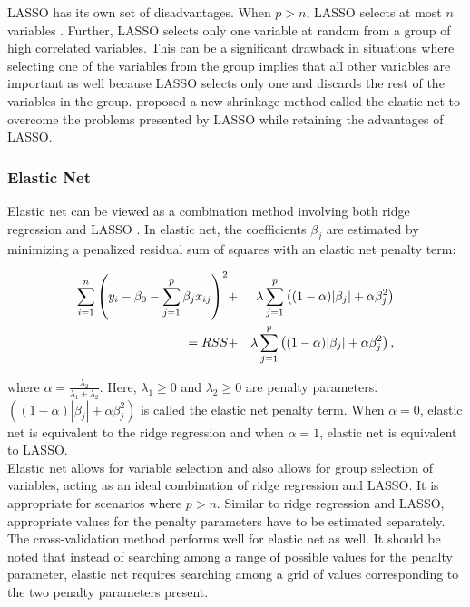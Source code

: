 LASSO has its own set of disadvantages. When $p>n$, LASSO selects at most $n$ variables \cite{zou_regularization_2005}. Further, LASSO selects only one variable at random from a group of high correlated variables. This can be a significant drawback in situations where selecting one of the variables from the group implies that all other variables are important as well because LASSO selects only one and discards the rest of the variables in the group. \cite{zou_regularization_2005} proposed a new shrinkage method called the elastic net to overcome the problems presented by LASSO while retaining the advantages of LASSO. \\


\subsubsection{Elastic Net}

Elastic net can be viewed as a combination method involving both ridge regression and LASSO \cite{zou_regularization_2005}. In elastic net, the coefficients $\beta_j$ are estimated by minimizing a penalized residual sum of squares with an elastic net penalty term:

\begin{eqnarray}
\sum_{i = 1}^n \left( y_i - \beta_0 - \sum_{j = 1}^p \beta_j x_{ij} \right)^2 &+& \lambda \sum_{j = 1}^p \left( (1-\alpha) |\beta_j| + \alpha \beta_j^2 \right) \notag \\
= RSS &+&  \lambda \sum_{j = 1}^p \left( (1-\alpha) |\beta_j| + \alpha \beta_j^2 \right) ,
\end{eqnarray}

\noindent where $\alpha = \frac{\lambda_2}{\lambda_1+\lambda_2}$. Here, $\lambda_1 \geq 0$ and $\lambda_2 \geq 0$ are penalty parameters. $\left( (1-\alpha) |\beta_j| + \alpha \beta_j^2 \right)$ is called the elastic net penalty term. When $\alpha=0$, elastic net is equivalent to the ridge regression and when $\alpha = 1$, elastic net is equivalent to LASSO. \\

Elastic net allows for variable selection and also allows for group selection of variables, acting as an ideal combination of ridge regression and LASSO. It is appropriate for scenarios where $p > n$. Similar to ridge regression and LASSO, appropriate values for the penalty parameters have to be estimated separately. The cross-validation method performs well for elastic net as well. It should be noted that instead of searching among a range of possible values for the penalty parameter, elastic net requires searching among a grid of values corresponding to the two penalty parameters present. \\

